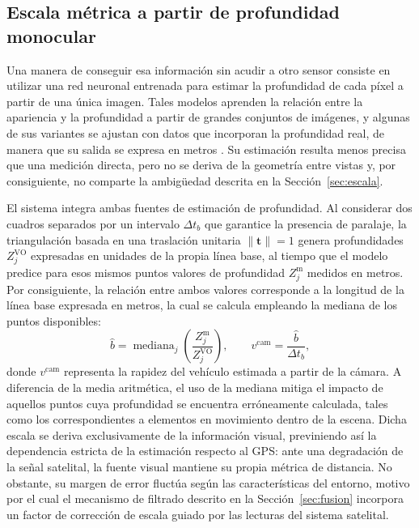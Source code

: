 \subsection{Escala métrica a partir de profundidad monocular}
\label{sec:escala-metrica}

Una manera de conseguir esa información sin acudir a otro sensor consiste en utilizar una red neuronal entrenada para estimar la profundidad de cada píxel a partir de una única imagen.
Tales modelos aprenden la relación entre la apariencia y la profundidad a partir de grandes conjuntos de imágenes, y algunas de sus variantes se ajustan con datos que incorporan la profundidad real, de manera que su salida se expresa en metros \cite{yang2024depthanything}.
Su estimación resulta menos precisa que una medición directa, pero no se deriva de la geometría entre vistas y, por consiguiente, no comparte la ambigüedad descrita en la Sección~\ref{sec:escala}.

El sistema integra ambas fuentes de estimación de profundidad.
Al considerar dos cuadros separados por un intervalo $\Delta t_b$ que garantice la presencia de paralaje, la triangulación basada en una traslación unitaria $\|\mathbf{t}\|=1$ genera profundidades $Z_j^{\mathrm{VO}}$ expresadas en unidades de la propia línea base, al tiempo que el modelo predice para esos mismos puntos valores de profundidad $Z_j^{\mathrm{m}}$ medidos en metros.
Por consiguiente, la relación entre ambos valores corresponde a la longitud de la línea base expresada en metros, la cual se calcula empleando la mediana de los puntos disponibles:
\begin{equation}
\hat{b} = \operatorname{mediana}_{j}\!\left( \frac{Z_j^{\mathrm{m}}}{Z_j^{\mathrm{VO}}} \right),
\qquad
v^{\mathrm{cam}} = \frac{\hat{b}}{\Delta t_b},
\label{eq:escala-metrica}
\end{equation}
donde $v^{\mathrm{cam}}$ representa la rapidez del vehículo estimada a partir de la cámara.
A diferencia de la media aritmética, el uso de la mediana mitiga el impacto de aquellos puntos cuya profundidad se encuentra erróneamente calculada, tales como los correspondientes a elementos en movimiento dentro de la escena.
Dicha escala se deriva exclusivamente de la información visual, previniendo así la dependencia estricta de la estimación respecto al GPS: ante una degradación de la señal satelital, la fuente visual mantiene su propia métrica de distancia.
No obstante, su margen de error fluctúa según las características del entorno, motivo por el cual el mecanismo de filtrado descrito en la Sección~\ref{sec:fusion} incorpora un factor de corrección de escala guiado por las lecturas del sistema satelital.

